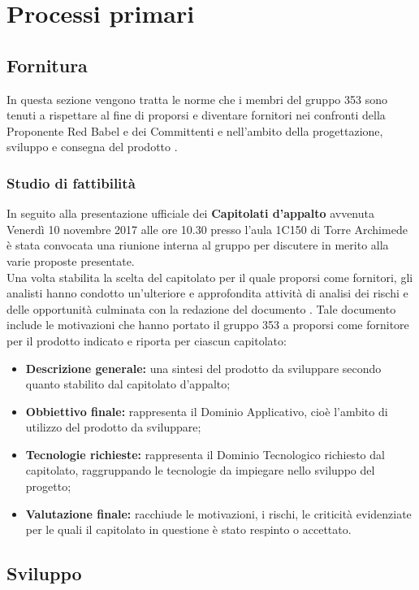 \documentclass[NormeDiProgetto.tex]{subfiles}
\begin{document}
\chapter{Processi primari}
\section{Fornitura}
In questa sezione vengono tratta le norme che i membri del gruppo 353 sono tenuti a rispettare al fine di proporsi e diventare fornitori nei confronti della Proponente Red Babel e dei Committenti \Vardanega{} e \Cardin{} nell'ambito della progettazione, sviluppo e consegna del prodotto \progetto.

\subsection{Studio di fattibilità}
In seguito alla presentazione ufficiale dei \textbf{Capitolati d'appalto} avvenuta Venerdì 10 novembre 2017 alle ore 10.30 presso l'aula 1C150 di Torre Archimede è stata convocata una riunione interna al gruppo per discutere in merito alla varie proposte presentate.\\
Una volta stabilita la scelta del capitolato per il quale proporsi come fornitori, gli analisti hanno condotto un'ulteriore e approfondita attività di analisi dei rischi e delle opportunità culminata con la redazione del documento \sdf \vruno. Tale documento include le motivazioni che hanno portato il gruppo 353 a proporsi come fornitore per il prodotto indicato e riporta per ciascun capitolato:
\begin{itemize}
	\item \textbf{Descrizione generale:} una sintesi del prodotto da sviluppare secondo quanto stabilito dal capitolato d'appalto;
	\item \textbf{Obbiettivo finale:} rappresenta il Dominio Applicativo, cioè l'ambito di utilizzo del prodotto da sviluppare;
	\item \textbf{Tecnologie richieste:} rappresenta il Dominio Tecnologico richiesto dal capitolato, raggruppando le tecnologie da impiegare nello sviluppo del progetto;
	\item \textbf{Valutazione finale:} racchiude le motivazioni, i rischi, le criticità evidenziate per le quali il capitolato in questione è stato respinto o accettato.
\end{itemize}

\section{Sviluppo}
\end{document}
